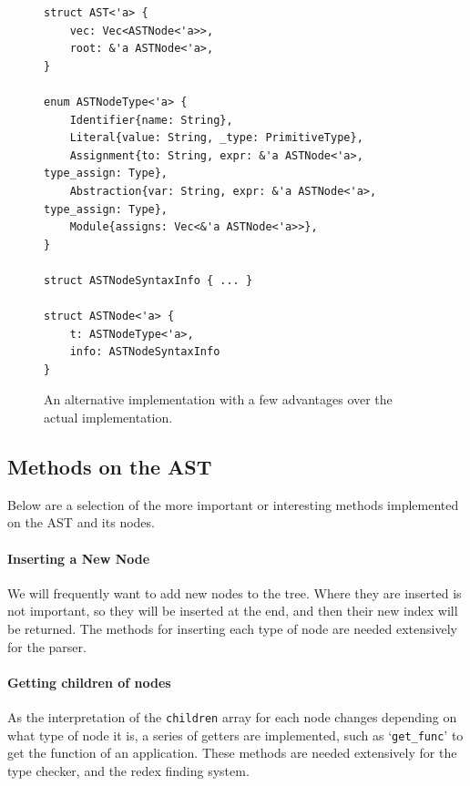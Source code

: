 \begin{figure}[t]
    \begin{lstlisting}[language=Rust_boxed]
struct AST<'a> {
    vec: Vec<ASTNode<'a>>,
    root: &'a ASTNode<'a>,
}

enum ASTNodeType<'a> {
    Identifier{name: String},
    Literal{value: String, _type: PrimitiveType},
    Assignment{to: String, expr: &'a ASTNode<'a>, type_assign: Type},
    Abstraction{var: String, expr: &'a ASTNode<'a>, type_assign: Type},
    Module{assigns: Vec<&'a ASTNode<'a>>},
} 

struct ASTNodeSyntaxInfo { ... }

struct ASTNode<'a> {
    t: ASTNodeType<'a>,
    info: ASTNodeSyntaxInfo
}
    \end{lstlisting}
    \caption{An alternative implementation with a few advantages over the actual implementation. }
    \label{fig:ast_lst_2}
\end{figure}

\subsection{Methods on the AST}
Below are a selection of the more important or interesting methods implemented on the \ac{AST} and its nodes. 

\paragraph{Inserting a New Node} We will frequently want to add new nodes to the tree. Where they are inserted is not important, so they will be inserted at the end, and then their new index will be returned. The methods for inserting each type of node are needed extensively for the parser.

\paragraph{Getting children of nodes} As the interpretation of the \verb|children| array for each node changes depending on what type of node it is, a series of getters are implemented, such as `\verb|get_func|' to get the function of an application. These methods are needed extensively for the type checker, and the redex finding system. 


